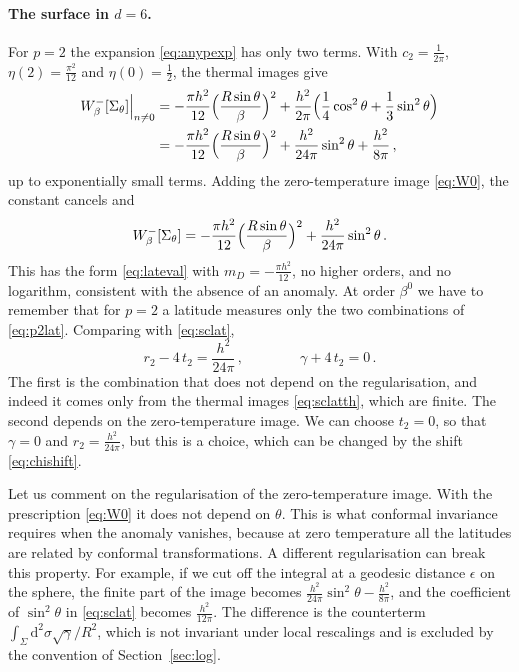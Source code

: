 \documentclass[a4paper,11pt]{article}
\newcommand{\dd}{\mathrm{d}}
\begin{document}
	\paragraph{The surface in $d=6$.}
	For $p=2$ the expansion \eqref{eq:anypexp} has only two terms. With $c_2=\tfrac{1}{2\pi}$, $\eta(2)=\tfrac{\pi^2}{12}$ and $\eta(0)=\tfrac12$, the thermal images give
	\begin{equation}\label{eq:sclatth}
		\begin{aligned}
			W^-_\beta[\Sigma_\theta]\Big|_{n\neq0}&=-\frac{\pi h^2}{12}\Bigl(\frac{R\sin\theta}{\beta}\Bigr)^{2}+\frac{h^2}{2\pi}\Bigl(\frac14\cos^2\theta+\frac13\sin^2\theta\Bigr)\\
			&=-\frac{\pi h^2}{12}\Bigl(\frac{R\sin\theta}{\beta}\Bigr)^{2}+\frac{h^2}{24\pi}\sin^2\theta+\frac{h^2}{8\pi}\, ,
		\end{aligned}
	\end{equation}
	up to exponentially small terms. Adding the zero-temperature image \eqref{eq:W0}, the constant cancels and
	\begin{equation}\label{eq:sclat}
		W^-_\beta[\Sigma_\theta]=-\frac{\pi h^2}{12}\Bigl(\frac{R\sin\theta}{\beta}\Bigr)^{2}+\frac{h^2}{24\pi}\sin^2\theta\, .
	\end{equation}
	This has the form \eqref{eq:lateval} with $m_D=-\tfrac{\pi h^2}{12}$, no higher orders, and no logarithm, consistent with the absence of an anomaly. At order $\beta^0$ we have to remember that for $p=2$ a latitude measures only the two combinations of \eqref{eq:p2lat}. Comparing with \eqref{eq:sclat},
	\begin{equation}\label{eq:sclatcoeff}
		r_2-4\,t_2=\frac{h^2}{24\pi}\, ,\qquad\qquad \gamma+4\,t_2=0\, .
	\end{equation}
	The first is the combination that does not depend on the regularisation, and indeed it comes only from the thermal images \eqref{eq:sclatth}, which are finite. The second depends on the zero-temperature image. We can choose $t_2=0$, so that $\gamma=0$ and $r_2=\tfrac{h^2}{24\pi}$, but this is a choice, which can be changed by the shift \eqref{eq:chishift}.
	
	Let us comment on the regularisation of the zero-temperature image. With the prescription \eqref{eq:W0} it does not depend on $\theta$. This is what conformal invariance requires when the anomaly vanishes, because at zero temperature all the latitudes are related by conformal transformations. A different regularisation can break this property. For example, if we cut off the integral at a geodesic distance $\epsilon$ on the sphere, the finite part of the image becomes $\tfrac{h^2}{24\pi}\sin^2\theta-\tfrac{h^2}{8\pi}$, and the coefficient of $\sin^2\theta$ in \eqref{eq:sclat} becomes $\tfrac{h^2}{12\pi}$. The difference is the counterterm $\int_\Sigma\dd^2\sigma\sqrt\gamma/R^2$, which is not invariant under local rescalings and is excluded by the convention of Section~\ref{sec:log}.
	
\end{document}
